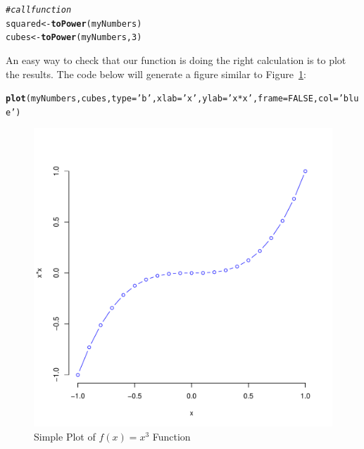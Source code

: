 \documentclass[10pt]{article}\usepackage[]{graphicx}\usepackage[]{color}
\makeatletter
\newcommand{\hlnum}[1]{\textcolor[rgb]{0.686,0.059,0.569}{#1}}%
\newcommand{\hlstr}[1]{\textcolor[rgb]{0.192,0.494,0.8}{#1}}%
\newcommand{\hlcom}[1]{\textcolor[rgb]{0.678,0.584,0.686}{\textit{#1}}}%
\newcommand{\hlstd}[1]{\textcolor[rgb]{0.345,0.345,0.345}{#1}}%
\newcommand{\hlkwb}[1]{\textcolor[rgb]{0.69,0.353,0.396}{#1}}%
\newcommand{\hlkwc}[1]{\textcolor[rgb]{0.333,0.667,0.333}{#1}}%
\newcommand{\hlkwd}[1]{\textcolor[rgb]{0.737,0.353,0.396}{\textbf{#1}}}%
\newenvironment{kframe}{%
 \def\at@end@of@kframe{}%
 \ifinner\ifhmode%
  \def\at@end@of@kframe{\end{minipage}}%
  \begin{minipage}{\columnwidth}%
 \fi\fi%
 \def\FrameCommand##1{\hskip\@totalleftmargin \hskip-\fboxsep
 \colorbox{shadecolor}{##1}\hskip-\fboxsep
     \hskip-\linewidth \hskip-\@totalleftmargin \hskip\columnwidth}%
 \MakeFramed {\advance\hsize-\width
   \@totalleftmargin\z@ \linewidth\hsize
   \@setminipage}}%
 {\par\unskip\endMakeFramed%
 \at@end@of@kframe}
\newenvironment{knitrout}{}{} %
\makeatother
\begin{document}
\begin{itemize}
\begin{knitrout}
\begin{kframe}
\begin{alltt}
\hlcom{# call function}
\hlstd{squared} \hlkwb{<-} \hlkwd{toPower}\hlstd{(myNumbers)}
\hlstd{cubes} \hlkwb{<-} \hlkwd{toPower}\hlstd{(myNumbers,}\hlnum{3}\hlstd{)}
\end{alltt}
\end{kframe}
\end{knitrout}

An easy way to check that our function is doing the right calculation is to plot the results. The code below will generate a figure similar to Figure~\ref{fig1}: 
\begin{knitrout}
\color{fgcolor}\begin{kframe}
\begin{alltt}
\hlkwd{plot}\hlstd{(myNumbers,cubes,}\hlkwc{type}\hlstd{=}\hlstr{'b'}\hlstd{,}\hlkwc{xlab} \hlstd{=} \hlstr{'x'}\hlstd{,} \hlkwc{ylab} \hlstd{=} \hlstr{'x*x'}\hlstd{,}\hlkwc{frame}\hlstd{=}\hlnum{FALSE}\hlstd{,}\hlkwc{col}\hlstd{=}\hlstr{'blue'}\hlstd{)}
\end{alltt}
\end{kframe}
\end{knitrout}


\begin{figure}[H] %
\begin{center}

\begin{knitrout}
\color{fgcolor}
\includegraphics[width=.47\linewidth]{figure/unnamed-chunk-29-1} 

\end{knitrout}

\caption {Simple Plot of $f(x)=x^3$ Function}
\label{fig1}
\end {center}
\end {figure}





\end{itemize}
\end{document}
